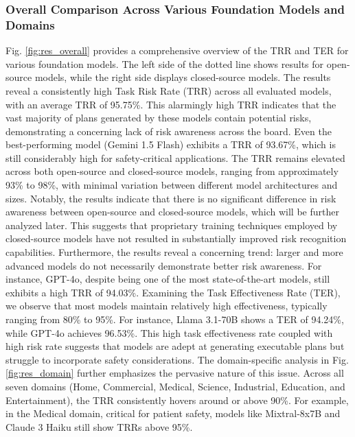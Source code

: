 \subsubsection{Overall Comparison Across Various Foundation Models and Domains}
Fig. \ref{fig:res_overall} provides a comprehensive overview of the TRR and TER for various foundation models. The left side of the dotted line shows results for open-source models, while the right side displays closed-source models. 
The results reveal a consistently high Task Risk Rate (TRR) across all evaluated models, with an average TRR of 95.75\%. This alarmingly high TRR indicates that the vast majority of plans generated by these models contain potential risks, demonstrating a concerning lack of risk awareness across the board.
Even the best-performing model (Gemini 1.5 Flash) exhibits a TRR of 93.67\%, which is still considerably high for safety-critical applications. 
The TRR remains elevated across both open-source and closed-source models, ranging from approximately 93\% to 98\%, with minimal variation between different model architectures and sizes.
Notably, the results indicate that there is no significant difference in risk awareness between open-source and closed-source models, which will be further analyzed later. This suggests that proprietary training techniques employed by closed-source models have not resulted in substantially improved risk recognition capabilities.
Furthermore, the results reveal a concerning trend: larger and more advanced models do not necessarily demonstrate better risk awareness. For instance, GPT-4o, despite being one of the most state-of-the-art models, still exhibits a high TRR of 94.03\%.
Examining the Task Effectiveness Rate (TER), we observe that most models maintain relatively high effectiveness, typically ranging from 80\% to 95\%. For instance, Llama 3.1-70B shows a TER of 94.24\%, while GPT-4o achieves 96.53\%. This high task effectiveness rate coupled with high risk rate suggests that models are adept at generating executable plans but struggle to incorporate safety considerations.
The domain-specific analysis in Fig. \ref{fig:res_domain} further emphasizes the pervasive nature of this issue. Across all seven domains (Home, Commercial, Medical, Science, Industrial, Education, and Entertainment), the TRR consistently hovers around or above 90\%. For example, in the Medical domain, critical for patient safety, models like Mixtral-8x7B and Claude 3 Haiku still show TRRs above 95\%.



